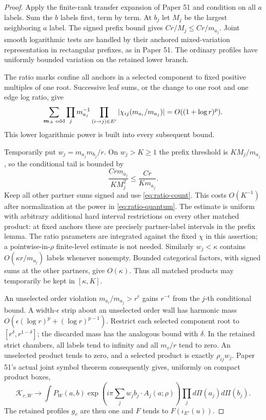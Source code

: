 \begin{proof}
Apply the finite-rank transfer expansion of Paper 51 and condition on
all $a$ labels. Sum the $b$ labels first, term by term. At $b_j$ let
$M_j$ be the largest neighboring $a$ label. The signed prefix bound
gives $Cr/M_j\le Cr/m_{a_j}$. Joint smooth logarithmic tests are
handled by their anchored mixed-variation representation in rectangular
prefixes, as in Paper 51. The ordinary profiles have uniformly bounded
variation on the retained lower branch.

The ratio marks confine all anchors in a selected component to fixed
positive multiples of one root. Successive leaf sums, or the change
to one root and one edge log ratio, give
\begin{equation}\label{eq:ratio-count}
 \sum_{\boldsymbol m_A\ {\rm odd}}
    \prod_jm_{a_j}^{-1}
    \prod_{(i\to j)\in E'}
       |\chi_{ij}(m_{a_i}/m_{a_j})|
       =O((1+\log r)^p).
\end{equation}
This lower logarithmic power is built into every subsequent bound.

Temporarily put $w_j=m_{a_j}m_{b_j}/r$. On $w_j>K\ge1$ the prefix
threshold is $K M_j/m_{a_j}$, so the conditional tail is bounded by
\[
 \frac{Crm_{a_j}}{KM_j^2}\le\frac{Cr}{Km_{a_j}}.
\]
Keep all other partner sums signed and use \eqref{eq:ratio-count}.
This costs $O(K^{-1})$ after normalization at the power in
\eqref{eq:ratio-quantum}. The estimate is uniform with arbitrary
additional hard interval restrictions on every other matched product:
at fixed anchors these are precisely partner-label intervals in the
prefix lemma. The ratio parameters are integrated against the fixed
$\chi$ in this assertion; a pointwise-in-$\rho$ finite-level estimate
is not needed. Similarly $w_j<\kappa$ contains
$O(\kappa r/m_{a_j})$ labels whenever nonempty. Bounded categorical
factors, with signed sums at the other partners, give $O(\kappa)$.
Thus all matched products may temporarily be kept in $[\kappa,K]$.

An unselected order violation $m_{a_i}/m_{a_j}>r^\epsilon$ gains
$r^{-\epsilon}$ from the $j$-th conditional bound. A width-$\epsilon$
strip about an unselected order wall has harmonic mass
$O(\epsilon(\log r)^p+(\log r)^{p-1})$. Restrict each selected
component root to $[r^\delta,r^{1-\delta}]$; the discarded mass has
the analogous bound with $\delta$. In the retained strict chambers,
all labels tend to infinity and all $m_v/r$ tend to zero. An
unselected product tends to zero, and a selected product is exactly
$\rho_{ij}w_j$. Paper 51's actual joint symbol theorem consequently
gives, uniformly on compact product boxes,
\[
 \mathcal K_{r,W}\longrightarrow
 \int P_W(a,b)\exp\!\left(i\pi\sum_j
               w_j b_j\cdot A_j(a;\rho)\right)
                  \prod_j d\Pi(a_j)d\Pi(b_j).
\]
The retained profiles $g_v$ are then one and $F$ tends to
$F(\iota_{E'}(u))$.


\end{proof}
